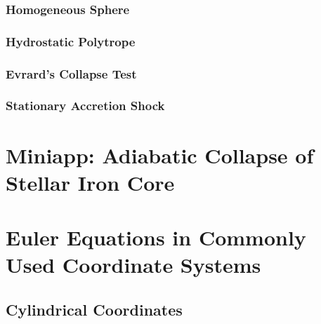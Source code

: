 \documentclass[10pt,preprint]{aastex}
\begin{document}
\subsubsection{Homogeneous Sphere}

\subsubsection{Hydrostatic Polytrope}

\subsubsection{Evrard's Collapse Test}

\subsubsection{Stationary Accretion Shock}

\section{Miniapp: Adiabatic Collapse of Stellar Iron Core}




\appendix

\section{Euler Equations in Commonly Used Coordinate Systems}
\label{app:CurvilinearEuler}

\subsection{Cylindrical Coordinates}
\end{document}
